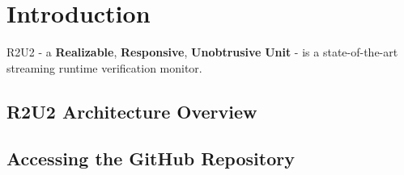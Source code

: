 \section{Introduction}
R2U2 - a \textbf{Realizable}, \textbf{Responsive}, \textbf{Unobtrusive} \textbf{Unit} - is a state-of-the-art streaming runtime verification monitor.  

\subsection{R2U2 Architecture Overview}

\subsection{Accessing the GitHub Repository}


\clearpage
